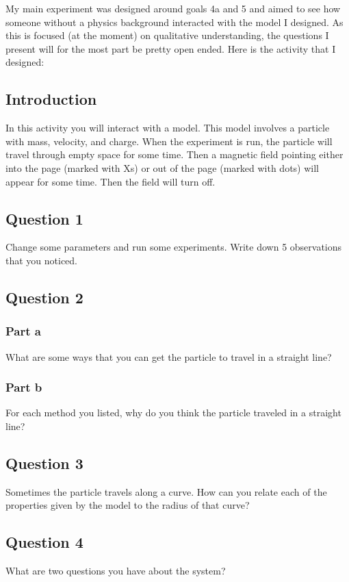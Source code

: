 \documentclass[11pt]{article}
\begin{document}
   	    My main experiment was designed around goals 4a and 5 and aimed to see how someone without a physics background interacted with the model I designed. As this is focused (at the moment) on qualitative understanding, the questions I present will for the most part be pretty open ended. Here is the activity that I designed:
   	    
   	    \subsection*{Introduction}
   	    
   	    	In this activity you will interact with a model. This model involves a particle with mass, velocity, and charge. When the experiment is run, the particle will travel through empty space for some time. Then a magnetic field pointing either into the page (marked with Xs) or out of the page (marked with dots) will appear for some time. Then the field will turn off.
   	    
   	    \subsection*{Question 1}
			Change some parameters and run some experiments. Write down 5 observations that you noticed.
			
		\subsection*{Question 2}
			\subsubsection*{Part a}
				What are some ways that you can get the particle to travel in a straight line?
				
			\subsubsection*{Part b}
				For each method you listed, why do you think the particle traveled in a straight line?
			
		\subsection*{Question 3}
			Sometimes the particle travels along a curve. How can you relate each of the properties given by the model to the radius of that curve?
			
		\subsection*{Question 4}
			What are two questions you have about the system? \\[12pt]
			
\end{document}
